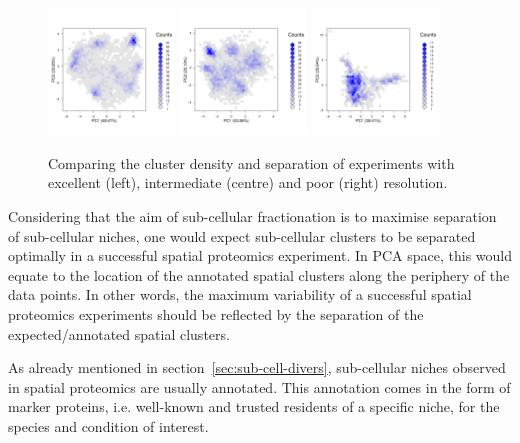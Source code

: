 \documentclass[12pt]{article}\usepackage[]{graphicx}\usepackage[]{color}
\begin{document}
\begin{figure}[ht]
  \centering
  \includegraphics[width = 0.3\textwidth]{./figure/hexbin-1.pdf}
  \includegraphics[width = 0.3\textwidth]{./figure/hexbin-2.pdf}
  \includegraphics[width = 0.3\textwidth]{./figure/hexbin-3.pdf}
  \caption{Comparing the cluster density and separation of experiments
    with excellent (left), intermediate (centre) and poor (right)
    resolution.}
  \label{fig:hexbin1}
\end{figure}

Considering that the aim of sub-cellular fractionation is to maximise
separation of sub-cellular niches, one would expect
sub-cellular clusters to be separated optimally in a successful
spatial proteomics experiment. In PCA space, this would equate to the
location of the annotated spatial clusters along the periphery of the
data points. In other words, the maximum variability of a successful
spatial proteomics experiments should be reflected by the separation
of the expected/annotated spatial clusters.

As already mentioned in section~\ref{sec:sub-cell-divers},
sub-cellular niches observed in spatial proteomics are usually
annotated. This annotation comes in the form of marker proteins,
i.e. well-known and trusted residents of a specific niche, for the
species and condition of interest.
\end{document}
